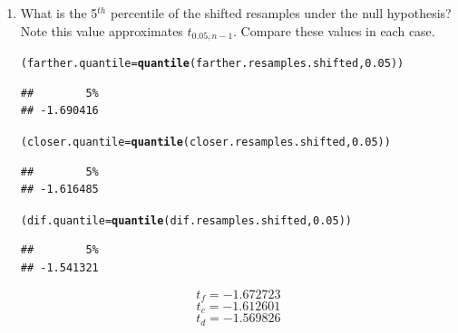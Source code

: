 \documentclass{article}\usepackage[]{graphicx}\usepackage[]{xcolor}
\makeatletter
\newcommand{\hlnum}[1]{\textcolor[rgb]{0.686,0.059,0.569}{#1}}%
\newcommand{\hldef}[1]{\textcolor[rgb]{0.345,0.345,0.345}{#1}}%
\newcommand{\hlkwb}[1]{\textcolor[rgb]{0.69,0.353,0.396}{#1}}%
\newcommand{\hlkwd}[1]{\textcolor[rgb]{0.737,0.353,0.396}{\textbf{#1}}}%
\newenvironment{kframe}{%
 \def\at@end@of@kframe{}%
 \ifinner\ifhmode%
  \def\at@end@of@kframe{\end{minipage}}%
  \begin{minipage}{\columnwidth}%
 \fi\fi%
 \def\FrameCommand##1{\hskip\@totalleftmargin \hskip-\fboxsep
 \colorbox{shadecolor}{##1}\hskip-\fboxsep
     \hskip-\linewidth \hskip-\@totalleftmargin \hskip\columnwidth}%
 \MakeFramed {\advance\hsize-\width
   \@totalleftmargin\z@ \linewidth\hsize
   \@setminipage}}%
 {\par\unskip\endMakeFramed%
 \at@end@of@kframe}
\newenvironment{knitrout}{}{} %
\makeatother
\begin{document}
\begin{enumerate}
\begin{enumerate}
    \item What is the 5$^{th}$ percentile of the shifted resamples under the null hypothesis? 
  Note this value approximates $t_{0.05, n-1}$. Compare these values in each case.
\begin{knitrout}\scriptsize
{}\color{fgcolor}\begin{kframe}
\begin{alltt}
\hldef{(farther.quantile} \hlkwb{=} \hlkwd{quantile}\hldef{(farther.resamples.shifted,} \hlnum{0.05}\hldef{))}
\end{alltt}
\begin{verbatim}
##        5% 
## -1.690416
\end{verbatim}
\begin{alltt}
\hldef{(closer.quantile} \hlkwb{=} \hlkwd{quantile}\hldef{(closer.resamples.shifted,} \hlnum{0.05}\hldef{))}
\end{alltt}
\begin{verbatim}
##        5% 
## -1.616485
\end{verbatim}
\begin{alltt}
\hldef{(dif.quantile} \hlkwb{=} \hlkwd{quantile}\hldef{(dif.resamples.shifted,} \hlnum{0.05}\hldef{))}
\end{alltt}
\begin{verbatim}
##        5% 
## -1.541321
\end{verbatim}
\end{kframe}
\end{knitrout}
\[t_f = -1.672723\]
\[t_c = -1.612601\]
\[t_d = -1.569826\]


\end{enumerate}
\end{enumerate}
\end{document}

